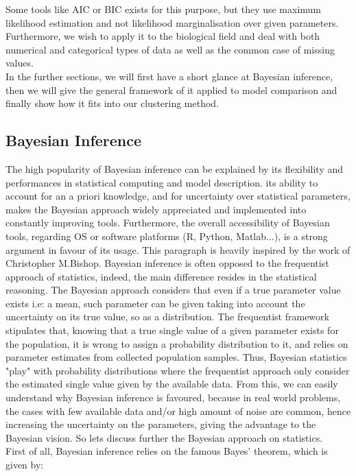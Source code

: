 \documentclass[twocolumn,12pt]{article}
\begin{document}
Some tools like AIC or BIC\cite{burnham} exists for this purpose, but they use maximum likelihood estimation and not likelihood marginalisation over given parameters. Furthermore, we wish to apply it to the biological field and deal with both numerical and categorical types of data as well as the common case of missing values.\\
In the further sections, we will first have a short glance at Bayesian inference, then we will give the general framework of it applied to model comparison and finally show how it fits into our clustering method.

\subsection{Bayesian Inference}

The high popularity of Bayesian inference can be explained by its flexibility and performances in statistical computing and model description. its ability to account for an a priori knowledge, and for uncertainty over statistical parameters, makes the Bayesian approach widely appreciated and implemented into constantly improving tools.
Furthermore, the overall accessibility of Bayesian tools, regarding OS or software platforms (R, Python, Matlab...), is a strong argument in favour of its usage.
This paragraph is heavily inspired by the work of Christopher M.Bishop\cite{bishop}.
Bayesian inference is often opposed to the frequentist approach of statistics, indeed, the main difference resides in the statistical reasoning.
The Bayesian approach considers that even if a true parameter value exists i.e: a mean, such parameter can be given taking into account the uncertainty on its true value, so as a distribution.
The frequentist framework stipulates that, knowing that a true single value of a given parameter exists for the population, it is wrong to assign a probability distribution to it, and relies on parameter estimates from collected population samples.
Thus, Bayesian statistics "play" with probability distributions where the frequentist approach only consider the estimated single value given by the available data.
From this, we can easily understand why Bayesian inference is favoured, because in real world problems, the cases with few available data and/or high amount of noise are common, hence increasing the uncertainty on the parameters, giving the advantage to the Bayesian vision.
So lets discuss further the Bayesian approach on statistics.\\
First of all, Bayesian inference relies on the famous Bayes' theorem, which is given by:
\end{document}
